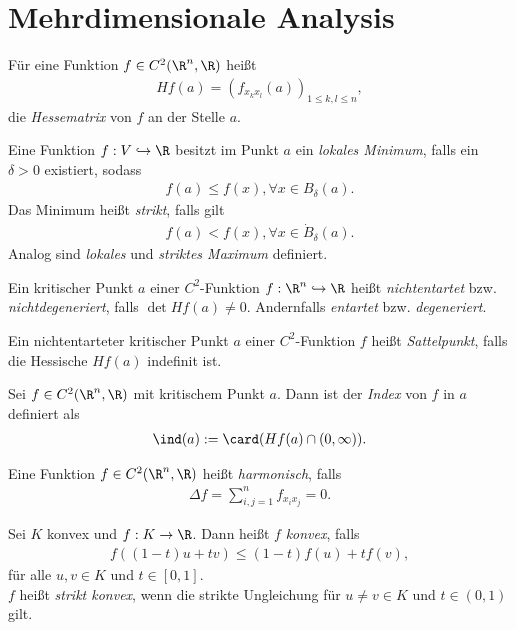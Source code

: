 \section{Mehrdimensionale Analysis}

\begin{defn}
Für eine Funktion $f\in C^2(\R^n,\R)$ heißt
\begin{align*}
Hf(a) = \left(f_{x_kx_l}(a)\right)_{1\le k,l\le n},
\end{align*}
die \emph{Hessematrix} von $f$ an der Stelle $a$.
\end{defn}
\begin{defn}
Eine Funktion $f: V\hookrightarrow \R$ besitzt im Punkt $a$ ein \emph{lokales
Minimum}, falls ein $\delta > 0$ existiert, sodass
\begin{align*}
f(a) \le f(x), \forall x\in B_\delta(a).
\end{align*}
Das Minimum heißt \emph{strikt}, falls gilt
\begin{align*}
f(a) < f(x), \forall x\in \dot{B}_\delta(a).
\end{align*}
Analog sind \emph{lokales} und \emph{striktes Maximum} definiert.
\end{defn}
\begin{defn}
Ein kritischer Punkt $a$ einer $C^2$-Funktion $f: \R^n\hookrightarrow\R$
heißt \emph{nichtentartet} bzw. \emph{nichtdegeneriert}, falls $\det Hf(a) \neq
0$. Andernfalls \emph{entartet} bzw. \emph{degeneriert}.
\end{defn}
\begin{defn}
Ein nichtentarteter kritischer Punkt $a$ einer $C^2$-Funktion $f$ heißt
\emph{Sattelpunkt}, falls die Hessische $Hf(a)$ indefinit ist.
\end{defn}
\begin{defn}
Sei $f\in C^2(\R^n,\R)$ mit kritischem Punkt $a$. Dann ist der \emph{Index} von
$f$ in $a$ definiert als 
\begin{align*}
\ind(a) := \card(Hf(a)\cap (0,\infty)).
\end{align*}
\end{defn}
\begin{defn}
Eine Funktion $f\in C^2(\R^n,\R)$ heißt \emph{harmonisch}, falls
\begin{align*}
\Delta f = \sum\limits_{i,j=1}^n f_{x_ix_j} = 0.
\end{align*}
\end{defn}
\begin{defn}
Sei $K$ konvex und $f: K\to\R$. Dann heißt $f$ \emph{konvex}, falls
\begin{align*}
f((1-t)u+tv) \le (1-t)f(u) + tf(v),
\end{align*}
für alle $u,v\in K$ und $t\in[0,1]$.\\
$f$ heißt \emph{strikt konvex}, wenn die strikte Ungleichung für $u\neq v\in
K$ und $t\in(0,1)$ gilt.
\end{defn}

